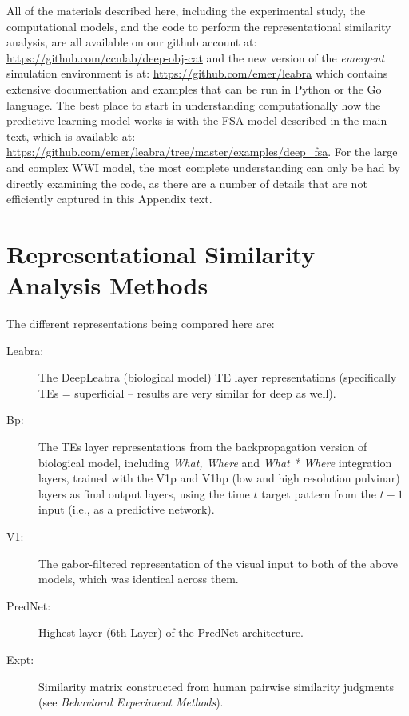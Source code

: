 
All of the materials described here, including the experimental study, the computational models, and the code to perform the representational similarity analysis, are all available on our github account at: \url{https://github.com/ccnlab/deep-obj-cat} and the new version of the {\em emergent} simulation environment is at: \url{https://github.com/emer/leabra} which contains extensive documentation and examples that can be run in Python or the Go language.  The best place to start in understanding computationally how the predictive learning model works is with the FSA model described in the main text, which is available at: \url{https://github.com/emer/leabra/tree/master/examples/deep_fsa}.  For the large and complex WWI model, the most complete understanding can only be had by directly examining the code, as there are a number of details that are not efficiently captured in this Appendix text.

\section{Representational Similarity Analysis Methods}

The different representations being compared here are:
\begin{description}
\item[Leabra:] The DeepLeabra (biological model) TE layer representations (specifically TEs = superficial -- results are very similar for deep as well).
\item[Bp:] The TEs layer representations from the backpropagation version of biological model, including {\em What, Where} and {\em What * Where} integration layers, trained with the V1p and V1hp (low and high resolution pulvinar) layers as final output layers, using the time $t$ target pattern from the $t-1$ input (i.e., as a predictive network).
\item[V1:] The gabor-filtered representation of the visual input to both of the above models, which was identical across them.
\item[PredNet:] Highest layer (6th Layer) of the PredNet architecture.

\item[Expt:] Similarity matrix constructed from human pairwise similarity judgments (see {\em Behavioral Experiment Methods}).
\end{description}

